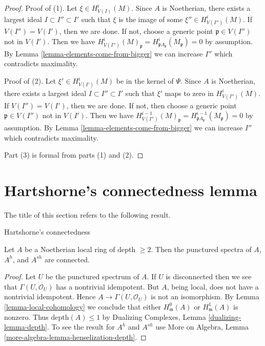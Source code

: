 \begin{proof}
Proof of (1).
Let $\xi \in H^i_{V(I)}(M)$. Since $A$ is Noetherian, there exists a
largest ideal $I \subset I'' \subset I'$ such that $\xi$ is the image
of some $\xi'' \in H^i_{V(I'')}(M)$. If $V(I'') = V(I')$, then we are
done. If not, choose a generic point $\mathfrak p \in V(I'')$ not in $V(I')$.
Then we have $H^i_{V(I'')}(M)_\mathfrak p =
H^i_{\mathfrak pA_\mathfrak p}(M_\mathfrak p) = 0$ by assumption.
By Lemma \ref{lemma-elements-come-from-bigger} we can increase $I''$
which contradicts maximality.

\medskip\noindent
Proof of (2). Let $\xi' \in H^i_{V(I')}(M)$ be in the kernel of $\Psi$.
Since $A$ is Noetherian, there exists a
largest ideal $I \subset I'' \subset I'$ such that $\xi'$
maps to zero in $H^i_{V(I'')}(M)$. If $V(I'') = V(I')$, then we are
done. If not, then choose a generic point $\mathfrak p  \in V(I'')$
not in $V(I')$. Then we have $H^{i - 1}_{V(I'')}(M)_\mathfrak p =
H^{i - 1}_{\mathfrak pA_\mathfrak p}(M_\mathfrak p) = 0$ by assumption.
By Lemma \ref{lemma-elements-come-from-bigger} we can increase $I''$
which contradicts maximality.

\medskip\noindent
Part (3) is formal from parts (1) and (2).
\end{proof}





\section{Hartshorne's connectedness lemma}
\label{section-hartshorne-connectedness}

\noindent
The title of this section refers to the following result.

\begin{lemma}
\label{lemma-depth-2-connected-punctured-spectrum}
\begin{reference}
\cite[Proposition 2.1]{Hartshorne-connectedness}
\end{reference}
\begin{slogan}
Hartshorne's connectedness
\end{slogan}
Let $A$ be a Noetherian local ring of depth $\geq 2$.
Then the punctured spectra of $A$, $A^h$, and $A^{sh}$ are connected.
\end{lemma}

\begin{proof}
Let $U$ be the punctured spectrum of $A$.
If $U$ is disconnected then we see that
$\Gamma(U, \mathcal{O}_U)$ has a nontrivial idempotent.
But $A$, being local, does not have a nontrivial idempotent.
Hence $A \to \Gamma(U, \mathcal{O}_U)$ is not an isomorphism.
By Lemma \ref{lemma-local-cohomology}
we conclude that either $H^0_\mathfrak m(A)$ or $H^1_\mathfrak m(A)$
is nonzero. Thus $\text{depth}(A) \leq 1$ by
Dualizing Complexes, Lemma \ref{dualizing-lemma-depth}.
To see the result for $A^h$ and $A^{sh}$ use
More on Algebra, Lemma \ref{more-algebra-lemma-henselization-depth}.
\end{proof}

